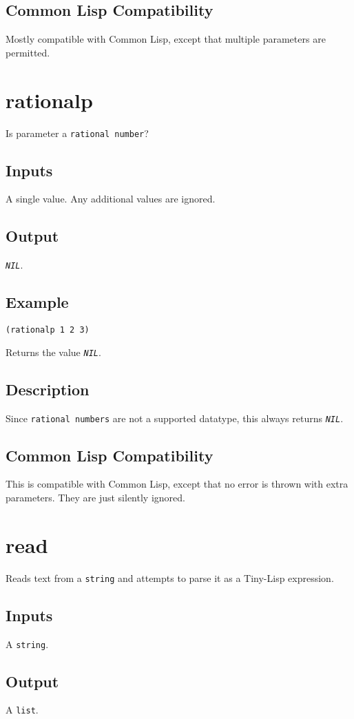 \documentclass[10pt, openany]{book}
\newcommand{\constant}[1]{\emph{\texttt{#1}}}
\newcommand{\datatype}[1]{\texttt{#1}}
\newcommand{\tl}{Tiny-Lisp}
\newcommand{\cl}{Common Lisp}
\begin{document}
\subsection{Common Lisp Compatibility}
Mostly compatible with \cl, except that multiple parameters are permitted.

\section{rationalp}
Is parameter a \datatype{rational number}?
\subsection{Inputs}
A single value.  Any additional values are ignored.
\subsection{Output}
\constant{NIL}.
\subsection{Example}
\begin{lstlisting}
(rationalp 1 2 3)
\end{lstlisting}
Returns the value \constant{NIL}.
\subsection{Description}
Since \datatype{rational numbers} are not a supported datatype, this always returns \constant{NIL}.
\subsection{Common Lisp Compatibility}
This is compatible with \cl, except that no error is thrown with extra parameters.  They are just silently ignored.

\section{read}
Reads text from a \datatype{string} and attempts to parse it as a \tl{} expression.
\subsection{Inputs}
A \datatype{string}.
\subsection{Output}
A \datatype{list}.
\end{document}
